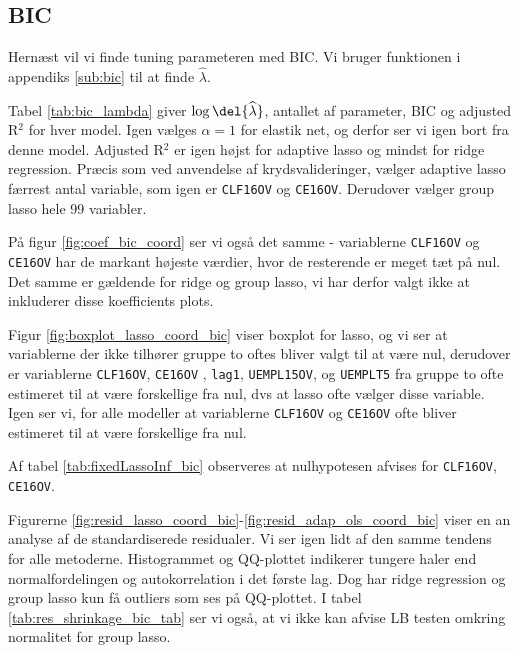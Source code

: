 \subsection{BIC}
Hernæst vil vi finde tuning parameteren med BIC. 
Vi bruger funktionen i appendiks \ref{sub:bic} til at finde $\widehat{\lambda}$. 

Tabel \ref{tab:bic_lambda} giver $\log \del{ \widehat\lambda}$, antallet af parameter, BIC og adjusted R$^2$ for hver model. 
Igen vælges \(\alpha = 1\) for elastik net, og derfor ser vi igen bort fra denne model.
Adjusted R$^2$ er igen højst for adaptive lasso og mindst for ridge regression. 
Præcis som ved anvendelse af krydsvalideringer, vælger adaptive lasso færrest antal variable, som igen er \texttt{CLF16OV} og \texttt{CE16OV}.
Derudover vælger group lasso hele 99 variabler. 



På figur \ref{fig:coef_bic_coord} ser vi også det samme - variablerne \texttt{CLF16OV} og \texttt{CE16OV} har de markant højeste værdier, hvor de resterende er meget tæt på nul. 
Det samme er gældende for ridge og group lasso, vi har derfor valgt ikke at inkluderer disse koefficients plots. 


Figur \ref{fig:boxplot_lasso_coord_bic} viser boxplot for lasso, og vi ser at variablerne der ikke tilhører gruppe to oftes bliver valgt til at være nul, derudover er variablerne  \texttt{CLF16OV},  \texttt{CE16OV} , \texttt{lag1}, \texttt{UEMPL15OV}, og \texttt{UEMPLT5} fra gruppe to ofte estimeret til at være forskellige fra nul, dvs at lasso ofte vælger disse variable. 
Igen ser vi, for alle modeller at variablerne \texttt{CLF16OV} og \texttt{CE16OV} ofte bliver estimeret til at være forskellige fra nul. 


Af tabel \ref{tab:fixedLassoInf_bic} observeres at nulhypotesen afvises for \texttt{CLF16OV}, \texttt{CE16OV}. 



Figurerne \ref{fig:resid_lasso_coord_bic}-\ref{fig:resid_adap_ols_coord_bic} viser en an analyse af de standardiserede residualer.
Vi ser igen lidt af den samme tendens for alle metoderne. 
Histogrammet og QQ-plottet indikerer tungere haler end normalfordelingen og autokorrelation i det første lag. 
Dog har ridge regression og group lasso kun få outliers som ses på QQ-plottet. 
I tabel \ref{tab:res_shrinkage_bic_tab} ser vi også, at vi ikke kan afvise LB testen omkring normalitet for group lasso. 

